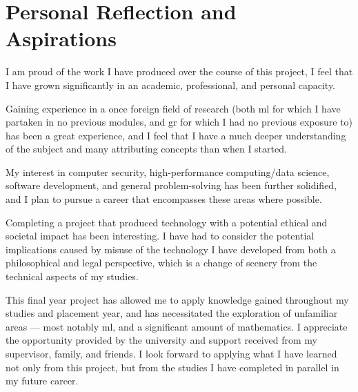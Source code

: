 \section{Personal Reflection and Aspirations}

I am proud of the work I have produced over the course of this project, 
I feel that I have grown significantly in an academic, professional, and personal capacity.

Gaining experience in a once foreign field of research (both \ac{ml} for which I have partaken in no previous modules, and \ac{gr} for which I had no previous exposure to) has been a great experience, 
and I feel that I have a much deeper understanding of the subject and many attributing concepts than when I started.

My interest in computer security, high-performance computing/data science, software development, and general problem-solving has been further solidified,
and I plan to pursue a career that encompasses these areas where possible.

Completing a project that produced technology with a potential ethical and societal impact has been interesting.
I have had to consider the potential implications caused by misuse of the technology I have developed from both a philosophical and legal perspective, which is a change of scenery from the technical aspects of my studies.

This final year project has allowed me to apply knowledge gained throughout my studies and placement year, 
and has necessitated the exploration of unfamiliar areas --- most notably \ac{ml}, and a significant amount of mathematics.
I appreciate the opportunity provided by the university and support received from my supervisor, family, and friends.
I look forward to applying what I have learned not only from this project, but from the studies I have completed in parallel in my future career.
